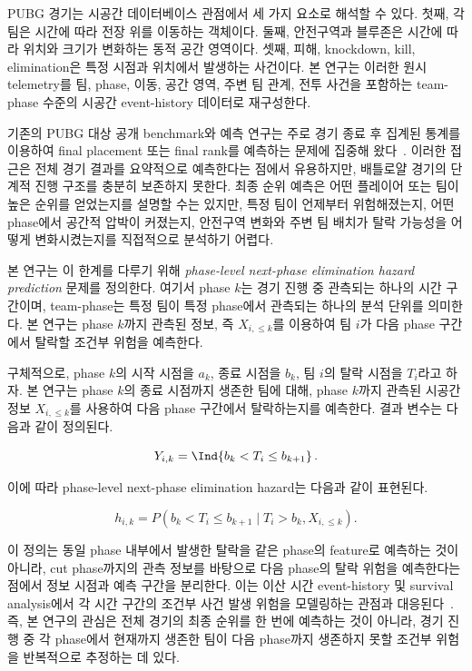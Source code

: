 PUBG 경기는 시공간 데이터베이스 관점에서 세 가지 요소로 해석할 수 있다. 첫째, 각 팀은 시간에 따라 전장 위를 이동하는 객체이다. 둘째, 안전구역과 블루존은 시간에 따라 위치와 크기가 변화하는 동적 공간 영역이다. 셋째, 피해, knockdown, kill, elimination은 특정 시점과 위치에서 발생하는 사건이다. 본 연구는 이러한 원시 telemetry를 팀, phase, 이동, 공간 영역, 주변 팀 관계, 전투 사건을 포함하는 team-phase 수준의 시공간 event-history 데이터로 재구성한다.

기존의 PUBG 대상 공개 benchmark와 예측 연구는 주로 경기 종료 후 집계된 통계를 이용하여 final placement 또는 final rank를 예측하는 문제에 집중해 왔다~\cite{kagglePubgFinishPlacement,sen2021pubgFinalRank,lee2025pubgRank}. 이러한 접근은 전체 경기 결과를 요약적으로 예측한다는 점에서 유용하지만, 배틀로얄 경기의 단계적 진행 구조를 충분히 보존하지 못한다. 최종 순위 예측은 어떤 플레이어 또는 팀이 높은 순위를 얻었는지를 설명할 수는 있지만, 특정 팀이 언제부터 위험해졌는지, 어떤 phase에서 공간적 압박이 커졌는지, 안전구역 변화와 주변 팀 배치가 탈락 가능성을 어떻게 변화시켰는지를 직접적으로 분석하기 어렵다.

본 연구는 이 한계를 다루기 위해 \textit{phase-level next-phase elimination hazard prediction} 문제를 정의한다. 여기서 phase \(k\)는 경기 진행 중 관측되는 하나의 시간 구간이며, team-phase는 특정 팀이 특정 phase에서 관측되는 하나의 분석 단위를 의미한다. 본 연구는 phase \(k\)까지 관측된 정보, 즉 \(X_{i,\leq k}\)를 이용하여 팀 \(i\)가 다음 phase 구간에서 탈락할 조건부 위험을 예측한다.

구체적으로, phase \(k\)의 시작 시점을 \(a_k\), 종료 시점을 \(b_k\), 팀 \(i\)의 탈락 시점을 \(T_i\)라고 하자. 본 연구는 phase \(k\)의 종료 시점까지 생존한 팀에 대해, phase \(k\)까지 관측된 시공간 정보 \(X_{i,\leq k}\)를 사용하여 다음 phase 구간에서 탈락하는지를 예측한다. 결과 변수는 다음과 같이 정의된다.

\[
Y_{i,k}
=
\Ind\!\left\{b_k < T_i \leq b_{k+1}\right\}.
\]

이에 따라 phase-level next-phase elimination hazard는 다음과 같이 표현된다.

\[
h_{i,k}
=
P(b_k < T_i \leq b_{k+1}
\mid T_i > b_k, X_{i,\leq k}).
\]

이 정의는 동일 phase 내부에서 발생한 탈락을 같은 phase의 feature로 예측하는 것이 아니라, cut phase까지의 관측 정보를 바탕으로 다음 phase의 탈락 위험을 예측한다는 점에서 정보 시점과 예측 구간을 분리한다. 이는 이산 시간 event-history 및 survival analysis에서 각 시간 구간의 조건부 사건 발생 위험을 모델링하는 관점과 대응된다~\cite{allison1982discrete,singer1993discrete}. 즉, 본 연구의 관심은 전체 경기의 최종 순위를 한 번에 예측하는 것이 아니라, 경기 진행 중 각 phase에서 현재까지 생존한 팀이 다음 phase까지 생존하지 못할 조건부 위험을 반복적으로 추정하는 데 있다.

